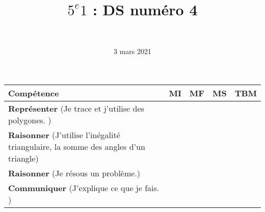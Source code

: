 \documentclass[a4paper,11pt]{exam}
\author{\ }
\date{3 mars 2021}
\title{$5^e 1$ : DS num\'ero 4}
\begin{document}
%	

	\maketitle
	

%

\vspace*{-0.5cm}
\begin{small}
	\begin{center}
		\begin{tabular}{|@{\ }l@{\ }|@{\ }c@{\ }|@{\ }c@{\ }|@{\ }c@{\ }|@{\ }c@{\ }|}
			\hline
			\textbf{Compétence} & \textbf{MI} & \textbf{MF} & \textbf{MS} & \textbf{TBM} \\
			\hline
			\textbf{Représenter} (Je trace et j'utilise des polygones.
			) &  \ \ & \ \ & \ \ & \ \  \\
			\hline	
			\textbf{Raisonner} (J'utilise l'inégalité triangulaire, la somme des angles d'un triangle) & \ \ & \ \ &  \ \  & \ \ \\
			\hline
			\textbf{Raisonner} (Je résous un problème.) & \ \ & \ \ &  \ \  & \ \ \\
			\hline
			\textbf{Communiquer} (J'explique ce que je fais. ) &  \ \ & \ \ & \ \ & \ \  \\
			\hline
		\end{tabular}
	\end{center}
\end{small}	

	
	
%	
%
%
%
%
%








%


\label{LastPage}
\end{document}
